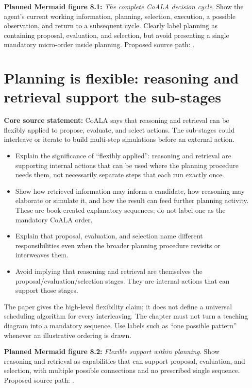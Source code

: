 \textbf{Planned Mermaid figure 8.1:} \emph{The complete CoALA decision cycle}. Show the agent's current working information, planning, selection, execution, a possible observation, and return to a subsequent cycle. Clearly label planning as containing proposal, evaluation, and selection, but avoid presenting a single mandatory micro-order inside planning. Proposed source path: .

\section{Planning is flexible: reasoning and retrieval support the sub-stages}
\textbf{Core source statement:} CoALA says that reasoning and retrieval can be flexibly applied to propose, evaluate, and select actions. The sub-stages could interleave or iterate to build multi-step simulations before an external action.
\begin{itemize}
  \item Explain the significance of ``flexibly applied'': reasoning and retrieval are supporting internal actions that can be used where the planning procedure needs them, not necessarily separate steps that each run exactly once.
  \item Show how retrieved information may inform a candidate, how reasoning may elaborate or simulate it, and how the result can feed further planning activity. These are book-created explanatory sequences; do not label one as the mandatory CoALA order.
  \item Explain that proposal, evaluation, and selection name different responsibilities even when the broader planning procedure revisits or interweaves them.
  \item Avoid implying that reasoning and retrieval are themselves the proposal/evaluation/selection stages. They are internal actions that can support those stages.
\end{itemize}
\begin{notebox}
The paper gives the high-level flexibility claim; it does not define a universal scheduling algorithm for every interleaving. The chapter must not turn a teaching diagram into a mandatory sequence. Use labels such as ``one possible pattern'' whenever an illustrative ordering is drawn.
\end{notebox}
\textbf{Planned Mermaid figure 8.2:} \emph{Flexible support within planning}. Show reasoning and retrieval as capabilities that can support proposal, evaluation, and selection, with multiple possible connections and no prescribed single sequence. Proposed source path: .

